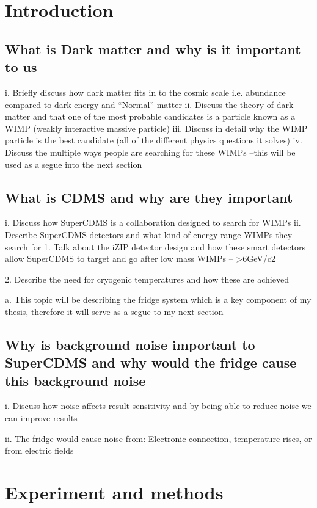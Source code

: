 \section{Introduction}
\subsection{What is Dark matter and why is it important to us}

i.	Briefly discuss how dark matter fits in to the cosmic scale i.e. abundance compared to dark energy and “Normal” matter
ii.	Discuss the theory of dark matter and that one of the most probable candidates is a particle known as a WIMP (weakly interactive massive particle)
iii.	Discuss in detail why the WIMP particle is the best candidate (all of the different physics questions it solves)
iv.	Discuss the multiple ways people are searching for these WIMPs –this will be used as a segue into the next section

\subsection{What is CDMS and why are they important}

i.	Discuss how SuperCDMS is a collaboration designed to search for WIMPs
ii.	Describe SuperCDMS detectors and what kind of energy range WIMPs they search for 
1. Talk about the iZIP detector design and how these smart detectors allow SuperCDMS to target and go after low mass WIMPs –   >6GeV/c2  

2. Describe the need for cryogenic temperatures and how these are achieved

a.	This topic will be describing the fridge system which is a key component of my thesis, therefore it will serve as a segue to my next section 

\subsection{	Why is background noise important to SuperCDMS and why would the fridge cause this background noise}
i.	Discuss how noise affects result sensitivity and by being able to reduce noise we can improve results 

ii.	The fridge would cause noise from: Electronic connection, temperature rises, or from electric fields

\section{Experiment and methods} 

